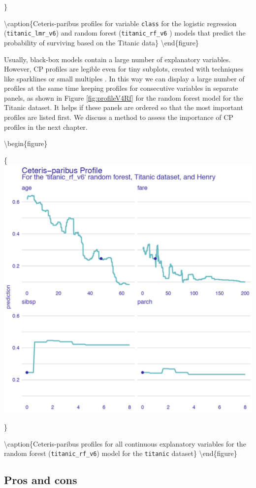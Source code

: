 \documentclass[12pt,]{krantz}
\begin{document}
\}

\textbackslash{}caption\{Ceteris-paribus profiles for variable \texttt{class} for the logistic regression (\texttt{titanic\_lmr\_v6}) and random forest (\texttt{titanic\_rf\_v6} ) models that predict the probability of surviving based on the Titanic data\}\label{fig:profileAgeRf2}
\textbackslash{}end\{figure\}

Usually, black-box models contain a large number of explanatory variables. However, CP profiles are legible even for tiny subplots, created with techniques like sparklines or small multiples \citep{Tufte1986}. In this way we can display a large number of profiles at the same time keeping profiles for consecutive variables in separate panels, as shown in Figure \ref{fig:profileV4Rf} for the random forest model for the Titanic dataset. It helps if these panels are ordered so that the most important profiles are listed first. We discuss a method to assess the importance of CP profiles in the next chapter.

\textbackslash{}begin\{figure\}

\{\centering \includegraphics[width=0.7\linewidth]{figure/profile_v4_rf3}

\}

\textbackslash{}caption\{Ceteris-paribus profiles for all continuous explanatory variables for the random forest (\texttt{titanic\_rf\_v6}) model for the \texttt{titanic} dataset\}\label{fig:profileV4Rf}
\textbackslash{}end\{figure\}

\hypertarget{CPProsCons}{%
\subsection{Pros and cons}\label{CPProsCons}}
\end{document}
